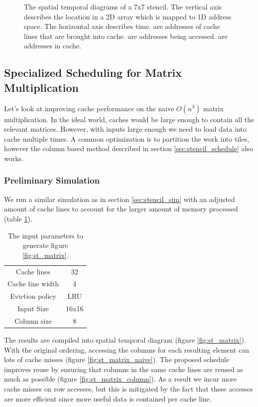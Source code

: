\documentclass{article}
\begin{document}
\begin{figure}
    \caption{
        The spatial temporal diagrams of a 7x7 stencil. The vertical axis describes the location in a 2D array which is mapped to 1D address space. The horizontal axis describes time.  are addresses of cache lines that are brought into cache.  are addresses being accessed.  are addresses in cache.
    }
    \label{fig:st_stencil}
\end{figure}

\subsection{Specialized Scheduling for Matrix Multiplication}
\label{sec:matrix_schedule}
Let's look at improving cache performance on the naive $O(n^3)$ matrix multiplication.
In the ideal world, caches would be large enough to contain all the relevant matrices.
However, with inputs large enough we need to load data into cache multiple times.
A common optimization is to partition the work into tiles, however the column based method described in section \ref{sec:stencil_schedule} also works.

\subsubsection{Preliminary Simulation}

We run a similar simulation as in section \ref{sec:stencil_sim} with an adjusted amount of cache lines to account for the larger amount of memory processed (table \ref{tab:sim_matrix_params}).

\begin{table}[H]
    \centering
    \begin{tabular}{|c c|}
        \hline
        Cache lines      & 32   \\
        Cache line width & 4    \\
        Eviction policy  & LRU  \\
        \hline
        Input Size       & 16x16\\
        Column size      & 8    \\
        \hline
    \end{tabular}
    \caption{
        The input parameters to generate figure \ref{fig:st_matrix}.
    }
    \label{tab:sim_matrix_params}
\end{table}

The results are compiled into spatial temporal diagram (figure \ref{fig:st_matrix}).
With the original ordering, accessing the columns for each resulting element can lots of cache misses (figure \ref{fig:st_matrix_naive}).
The proposed schedule improves reuse by ensuring that columns in the same cache lines are reused as much as possible (figure \ref{fig:st_matrix_column}).
As a result we incur more cache misses on row accesses, but this is mitigated by the fact that these accesses are more efficient since more useful data is contained per cache line.
\end{document}
